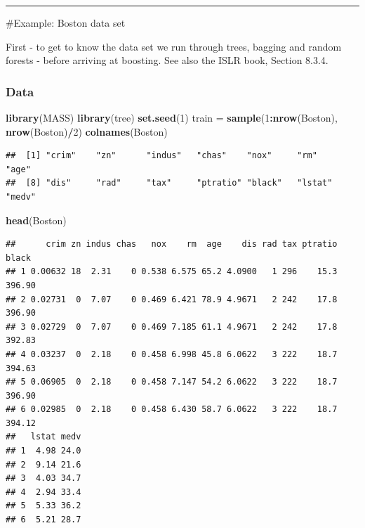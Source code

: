 \documentclass[]{article}
\newenvironment{Shaded}{\begin{snugshade}}{\end{snugshade}}
\newcommand{\DecValTok}[1]{\textcolor[rgb]{0.00,0.00,0.81}{#1}}
\newcommand{\KeywordTok}[1]{\textcolor[rgb]{0.13,0.29,0.53}{\textbf{#1}}}
\newcommand{\NormalTok}[1]{#1}
\newcommand{\OperatorTok}[1]{\textcolor[rgb]{0.81,0.36,0.00}{\textbf{#1}}}
\newcommand{\StringTok}[1]{\textcolor[rgb]{0.31,0.60,0.02}{#1}}
\begin{document}
\begin{center}\rule{0.5\linewidth}{\linethickness}\end{center}

\#Example: Boston data set

First - to get to know the data set we run through trees, bagging and
random forests - before arriving at boosting. See also the ISLR book,
Section 8.3.4.

\hypertarget{data}{%
\subsubsection{Data}\label{data}}

\begin{Shaded}
\begin{Highlighting}[]
\KeywordTok{library}\NormalTok{(MASS)}
\KeywordTok{library}\NormalTok{(tree)}
\KeywordTok{set.seed}\NormalTok{(}\DecValTok{1}\NormalTok{)}
\NormalTok{train =}\StringTok{ }\KeywordTok{sample}\NormalTok{(}\DecValTok{1}\OperatorTok{:}\KeywordTok{nrow}\NormalTok{(Boston), }\KeywordTok{nrow}\NormalTok{(Boston)}\OperatorTok{/}\DecValTok{2}\NormalTok{)}
\KeywordTok{colnames}\NormalTok{(Boston)}
\end{Highlighting}
\end{Shaded}

\begin{verbatim}
##  [1] "crim"    "zn"      "indus"   "chas"    "nox"     "rm"      "age"    
##  [8] "dis"     "rad"     "tax"     "ptratio" "black"   "lstat"   "medv"
\end{verbatim}

\begin{Shaded}
\begin{Highlighting}[]
\KeywordTok{head}\NormalTok{(Boston)}
\end{Highlighting}
\end{Shaded}

\begin{verbatim}
##      crim zn indus chas   nox    rm  age    dis rad tax ptratio  black
## 1 0.00632 18  2.31    0 0.538 6.575 65.2 4.0900   1 296    15.3 396.90
## 2 0.02731  0  7.07    0 0.469 6.421 78.9 4.9671   2 242    17.8 396.90
## 3 0.02729  0  7.07    0 0.469 7.185 61.1 4.9671   2 242    17.8 392.83
## 4 0.03237  0  2.18    0 0.458 6.998 45.8 6.0622   3 222    18.7 394.63
## 5 0.06905  0  2.18    0 0.458 7.147 54.2 6.0622   3 222    18.7 396.90
## 6 0.02985  0  2.18    0 0.458 6.430 58.7 6.0622   3 222    18.7 394.12
##   lstat medv
## 1  4.98 24.0
## 2  9.14 21.6
## 3  4.03 34.7
## 4  2.94 33.4
## 5  5.33 36.2
## 6  5.21 28.7
\end{verbatim}
\end{document}
